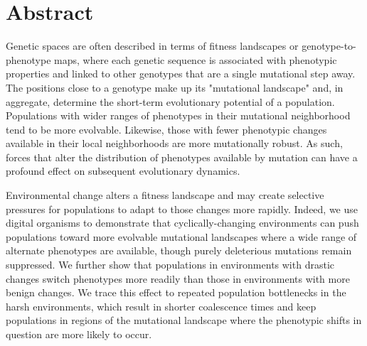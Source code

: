 \documentclass[10pt,letterpaper]{article}
\begin{document}
\section*{Abstract}
Genetic spaces are often described in terms of fitness landscapes or genotype-to-phenotype maps, where each genetic sequence is associated with phenotypic properties and linked to other genotypes that are a single mutational step away.  The positions close to a genotype make up its "mutational landscape" and, in aggregate, determine the short-term evolutionary potential of a population.
Populations with wider ranges of phenotypes in their mutational neighborhood tend to be more evolvable. Likewise, those with fewer phenotypic changes available in their local neighborhoods are more mutationally robust. As such, forces that alter the distribution of phenotypes available by mutation can have a profound effect on subsequent evolutionary dynamics.

Environmental change alters a fitness landscape and may create selective pressures for populations to adapt to those changes more rapidly.  Indeed, we use digital organisms to demonstrate that cyclically-changing environments can push populations toward more evolvable mutational landscapes where a wide range of alternate phenotypes are available, though purely deleterious mutations remain suppressed.
We further show that populations in environments with drastic changes switch phenotypes more readily than those in environments with more benign changes. We trace this effect to repeated population bottlenecks in the harsh environments, which result in shorter coalescence times and keep populations in regions of the mutational landscape where the phenotypic shifts in question are more likely to occur.

\linenumbers

\end{document}

